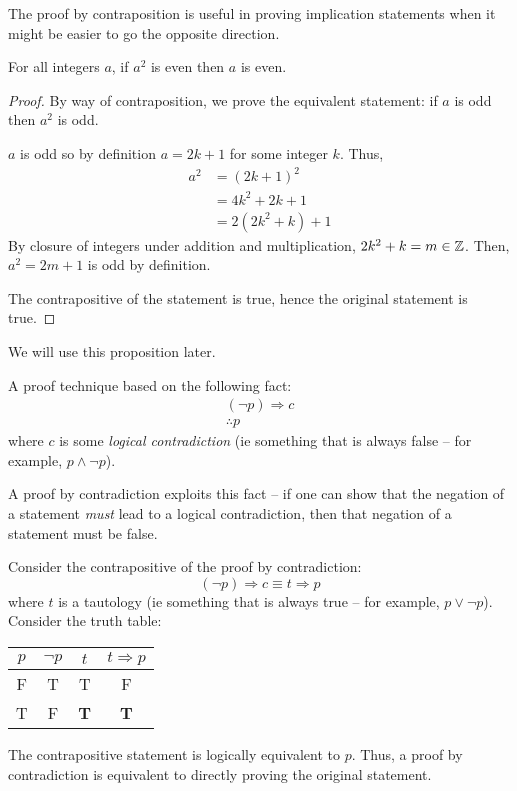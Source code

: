 \documentclass[main.tex]{subfiles}
\begin{document}
The proof by contraposition is useful in proving implication statements when it might be easier to go the opposite direction.

\begin{prop}\label{prop3.x:eucl-arg-lemma}
	For all integers \(a\), if \(a^2\) is even then \(a\) is even.
\end{prop}

\begin{proof}
	By way of contraposition, we prove the equivalent statement: if \(a\) is odd then \(a^2\) is odd.
	
	\(a\) is odd so by definition \(a = 2k+1\) for some integer \(k\). Thus,
	\begin{align*}
	a^2 &= (2k+1)^2 \\ &= 4k^2 + 2k + 1 \\ &= 2(2k^2 + k) + 1
	\end{align*}
	By closure of integers under addition and multiplication, \(2k^2 + k = m \in \mathbb{Z}\). Then, \(a^2 = 2m+1\) is odd by definition.
	
	The contrapositive of the statement is true, hence the original statement is true.
\end{proof}

We will use this proposition later.


\begin{defn}
	A proof technique based on the following fact:
	\begin{align*}
	(\lnot p) \Rightarrow c \\
	\therefore p
	\end{align*}
	where \(c\) is some \textit{logical contradiction} (ie something that is always false -- for example, \(p \land \lnot p\)).
	
	A proof by contradiction exploits this fact -- if one can show that the negation of a statement \textit{must} lead to a logical contradiction, then that negation of a statement must be false.
\end{defn}

Consider the contrapositive of the proof by contradiction:
\[(\lnot p) \Rightarrow c \equiv t \Rightarrow p\]
where \(t\) is a tautology (ie something that is always true -- for example, \(p \lor \lnot p\)). Consider the truth table:
\begin{center}
	\begin{tabular}{cc|c|c}
		\(p\) & \(\lnot p\) & \(t\) & \(t \Rightarrow p\) \\
		\midrule
		F & T & T & F \\
		T & F & \textbf{T} & \textbf{T}
	\end{tabular}
\end{center}
The contrapositive statement is logically equivalent to \(p\). Thus, a proof by contradiction is equivalent to directly proving the original statement.
\end{document}
